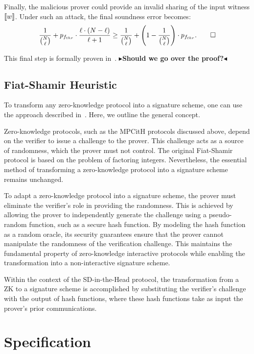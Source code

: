 \documentclass[11pt]{report}
\theoremstyle{definition}
\theoremstyle{plain}
\newcommand{\todo}[1]{{\color[rgb]{.5,0,0}\textbf{$\blacktriangleright$#1$\blacktriangleleft$}}}
\begin{document}
Finally, the malicious prover could provide an invalid sharing of the input witness $ \llbracket w \rrbracket $. Under such an attack, the final soundness error becomes:
\begin{align*}
  \frac{1}{\binom{N}{\ell}} + p_{f_{thr}} \cdot \frac{\ell \cdot (N - \ell)}{\ell + 1} \geq \frac{1}{\binom{N}{\ell}} + \left(1 - \frac{1}{\binom{N}{\ell}}\right) \cdot p_{f_{thr}}. \qed
\end{align*}

This final step is formally proven in~\cite[p20]{feneuil2023threshold}.
\todo{Should we go over the proof?}

\section{Fiat-Shamir Heuristic}\label{sec:fiatshamir}
To transform any zero-knowledge protocol into a signature scheme, one can use the approach described in~\cite{fiat1986prove}. Here, we outline the general concept.

Zero-knowledge protocols, such as the MPCitH protocols discussed above, depend on the verifier to issue a challenge to the prover. This challenge acts as a source of randomness, which the prover must not control. The original Fiat-Shamir protocol is based on the problem of factoring integers. Nevertheless, the essential method of transforming a zero-knowledge protocol into a signature scheme remains unchanged.

To adapt a zero-knowledge protocol into a signature scheme, the prover must eliminate the verifier's role in providing the randomness. This is achieved by allowing the prover to independently generate the challenge using a pseudo-random function, such as a secure hash function. By modeling the hash function as a random oracle, its security guarantees ensure that the prover cannot manipulate the randomness of the verification challenge. This maintains the fundamental property of zero-knowledge interactive protocols while enabling the transformation into a non-interactive signature scheme.

Within the context of the SD-in-the-Head protocol, the transformation from a ZK to a signature scheme is accomplished by substituting the verifier's challenge with the output of hash functions, where these hash functions take as input the prover's prior communications.

\chapter{Specification}\label{ch:spec}
\end{document}
